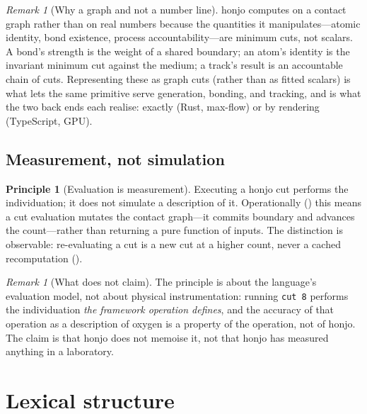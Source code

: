 \documentclass[11pt,twocolumn,a4paper]{article}
\theoremstyle{thmstyle}
\theoremstyle{definition}
\newtheorem{principle}[theorem]{Principle}
\theoremstyle{remark}
\newtheorem{remark}[theorem]{Remark}
\newcommand{\hj}[1]{\texttt{#1}}
\begin{document}
\begin{remark}[Why a graph and not a number line]
\label{rem:why-graph}
honjo computes on a contact graph rather than on real numbers because the
quantities it manipulates---atomic identity, bond existence, process
accountability---are minimum cuts, not scalars. A bond's strength is the
weight of a shared boundary; an atom's identity is the invariant minimum
cut against the medium; a track's result is an accountable chain of cuts.
Representing these as graph cuts (rather than as fitted scalars) is what
lets the same primitive serve generation, bonding, and tracking, and is
what the two back ends each realise: exactly (Rust, max-flow) or by
rendering (TypeScript, GPU).
\end{remark}

\subsection{Measurement, not simulation}

\begin{principle}[Evaluation is measurement]
\label{prin:measure}
Executing a honjo cut performs the individuation; it does not simulate a
description of it. Operationally () this means a cut
evaluation mutates the contact graph---it commits boundary and advances
the count---rather than returning a pure function of inputs. The
distinction is observable: re-evaluating a cut is a new cut at a higher
count, never a cached recomputation ().
\end{principle}

\begin{remark}[What  does not claim]
\label{rem:measure-scope}
The principle is about the language's evaluation model, not about
physical instrumentation: running \hj{cut 8} performs the individuation
\emph{the framework operation defines}, and the accuracy of that
operation as a description of oxygen is a property of the operation, not
of honjo. The claim is that honjo does not memoise it, not that honjo
has measured anything in a laboratory.
\end{remark}

\section{Lexical structure}
\label{sec:lexical}
\end{document}
